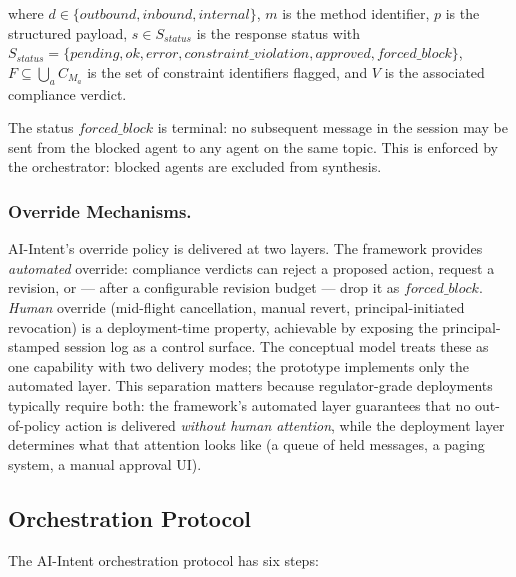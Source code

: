 \documentclass[runningheads]{llncs}
\begin{document}
\noindent where $d \in \{\mathit{outbound}, \mathit{inbound},
\mathit{internal}\}$, $m$ is the method identifier,
$p$ is the structured payload, $s \in S_{\mathit{status}}$ is the
response status with $S_{\mathit{status}} = \{\mathit{pending},
\mathit{ok}, \mathit{error}, \mathit{constraint\_violation},
\mathit{approved}, \mathit{forced\_block}\}$, $F \subseteq
\bigcup_{a} C_{M_a}$ is the set of constraint identifiers flagged, and
$V$ is the associated compliance verdict.

The status $\mathit{forced\_block}$ is terminal: no subsequent message
in the session may be sent from the blocked agent to any agent on the
same topic. This is enforced by the orchestrator: blocked agents are
excluded from synthesis.

\subsubsection{Override Mechanisms.}

AI-Intent's override policy is delivered at two layers. The
framework provides \emph{automated} override: compliance verdicts
can reject a proposed action, request a revision, or --- after a
configurable revision budget --- drop it as $\mathit{forced\_block}$.
\emph{Human} override (mid-flight cancellation, manual revert,
principal-initiated revocation) is a deployment-time property,
achievable by exposing the principal-stamped session log as a
control surface. The conceptual model treats these as one capability
with two delivery modes; the prototype implements only the automated
layer. This separation matters because regulator-grade deployments
typically require both: the framework's automated layer guarantees
that no out-of-policy action is delivered \emph{without human
attention}, while the deployment layer determines what that
attention looks like (a queue of held messages, a paging system, a
manual approval UI).

\subsection{Orchestration Protocol}
\label{sec:orchestration}

The AI-Intent orchestration protocol has six steps:
\end{document}
